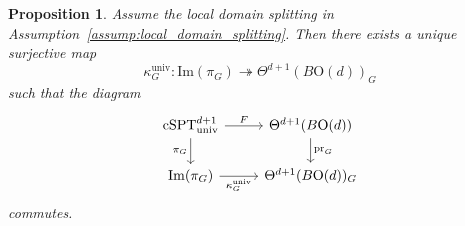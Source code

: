 \documentclass[aps,prx,reprint,superscriptaddress,twocolumn,amsmath,amssymb,amsfonts, nofootinbib]{revtex4-2}
\newcommand{\csptu}{\mathrm{cSPT}^{d+1}_{\mathrm{univ}}}
\theoremstyle{apsstyle}
\newtheorem{proposition}[theorem]{Proposition}
\begin{document}
\begin{proposition}
\label{prop:universal_local_continuum_limit}
Assume the local domain splitting in
Assumption~\ref{assump:local_domain_splitting}. Then there exists a unique surjective map
\begin{equation}
    \kappa^{\mathrm{univ}}_{G}:
    \mathrm{Im}(\pi_G)
    \twoheadrightarrow
    \Theta^{d+1}(B\mathrm{O}(d))_{G}
    \label{eq:universal_local_continuum_limit}
\end{equation}
such that the diagram
\begin{equation}
\begin{tikzcd}
    \csptu
    \arrow[r, "F"]
    \arrow[d, "\pi_G"']
    &
    \Theta^{d+1}(B\mathrm{O}(d))
    \arrow[d, "\mathrm{pr}_G"]
    \\
    \mathrm{Im}(\pi_G)
    \arrow[r, "\kappa_G^{\mathrm{univ}}"']
    &
    \Theta^{d+1}(B\mathrm{O}(d))_{G}
\end{tikzcd}
\label{eq:universal_local_continuum_limit_diagram}
\end{equation}
commutes.
\end{proposition}
\end{document}
